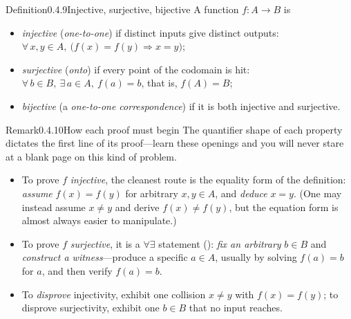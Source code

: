 \documentclass[main.tex]{subfiles}
\begin{document}
\begin{Obj}{Definition}{0.4.9}{Injective, surjective, bijective}
A function $f\colon A\to B$ is
\begin{itemize}
  \item \emph{injective} (\emph{one-to-one}) if distinct inputs give distinct outputs:
        $\forall\,x,y\in A,\ \bigl(f(x)=f(y)\Rightarrow x=y\bigr)$;
  \item \emph{surjective} (\emph{onto}) if every point of the codomain is hit:
        $\forall\,b\in B,\ \exists\,a\in A,\ f(a)=b$, that is, $f(A)=B$;
  \item \emph{bijective} (a \emph{one-to-one correspondence}) if it is both injective and surjective.
\end{itemize}
\end{Obj}

\begin{ObjL}{Remark}{0.4.10}{How each proof must begin}
The quantifier shape of each property dictates the first line of its proof---learn these openings and
you will never stare at a blank page on this kind of problem.
\begin{itemize}
  \item To prove $f$ \emph{injective}, the cleanest route is the equality form of the
        definition: \emph{assume} $f(x)=f(y)$ for arbitrary $x,y\in A$, and \emph{deduce} $x=y$. (One
        may instead assume $x\neq y$ and derive $f(x)\neq f(y)$, but the equation form is almost
        always easier to manipulate.)
  \item To prove $f$ \emph{surjective}, it is a $\forall\exists$ statement (): \emph{fix
        an arbitrary} $b\in B$ and \emph{construct a witness}---produce a specific $a\in A$, usually by
        solving $f(a)=b$ for $a$, and then verify $f(a)=b$.
  \item To \emph{disprove} injectivity, exhibit one collision $x\neq y$ with $f(x)=f(y)$; to disprove
        surjectivity, exhibit one $b\in B$ that no input reaches.
\end{itemize}
\end{ObjL}
\end{document}
